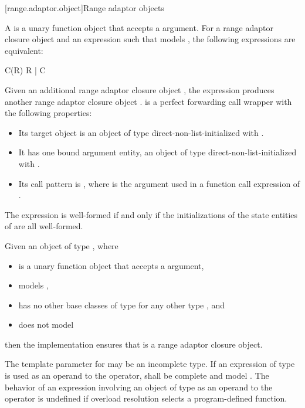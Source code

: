 [range.adaptor.object]{Range adaptor objects}

\pnum
A  is a unary function object that accepts
a  argument. For
a range adaptor closure object  and an expression  such that
 models , the following
expressions are equivalent:
\begin{codeblock}
C(R)
R | C
\end{codeblock}
Given an additional range adaptor closure object ,
the expression  produces another range adaptor
closure object .
 is a perfect forwarding call wrapper
with the following properties:
\begin{itemize}
\item
Its target object is an object  of type 
direct-non-list-initialized with .
\item
It has one bound argument entity,
an object  of type 
direct-non-list-initialized with .
\item
Its call pattern is ,
where  is the argument used in
a function call expression of .
\end{itemize}
The expression  is well-formed if and only if
the initializations of the state entities of  are all well-formed.

\pnum
Given an object  of type , where
\begin{itemize}
\item
{} is a unary function object that accepts a  argument,
\item
{} models ,
\item
{} has no other base classes of type  for any other type , and
\item
{} does not model 
\end{itemize}
then the implementation ensures
that  is a range adaptor closure object.

\pnum
The template parameter  for 
may be an incomplete type.
If an expression of type \cv{} 
is used as an operand to the \tcode{|} operator,
 shall be complete and
model .
The behavior of an expression involving an object of type \cv{} 
as an operand to the \tcode{|} operator is undefined
if overload resolution selects a program-defined  function.

